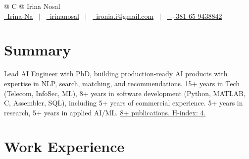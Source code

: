 \documentclass[a4paper,12pt]{article}
\begin{document}
\pagestyle{empty}



\begin{tabularx}{\linewidth}{@{} C @{}}
\LARGE{Irina Nosal} \\[7.5pt]


\href{https://github.com/Irina-Na}{\raisebox{-0.05\height}\faGithub\ Irina-Na} \ $|$ \
\href{https://linkedin.com/in/irinanosal}{\raisebox{-0.05\height}\faLinkedin\ irinanosal} \ $|$ \
\href{mailto:ironia.i@gmail.com}{\raisebox{-0.05\height}\faEnvelope \ ironia.i@gmail.com} \ $|$ \
\href{tel:+381652655159}{\raisebox{-0.05\height}\faMobile \ +381 65 9438842} \\
\end{tabularx}



\section{Summary}
{\small
Lead AI Engineer with PhD, building production-ready AI products with expertise in NLP, search, matching, and recommendations. 15+ years in Tech (Telecom, InfoSec, ML), 8+ years in software development (Python, MATLAB, C, Assembler, SQL), including 5+ years of commercial experience. 5+ years in research, 5+ years in applied AI/ML. \href{https://scholar.google.com/citations?user=g1m_ATEAAAAJ&hl=ru}{8+ publications. H-index: 4.}
}

\section{Work Experience}
\end{document}
